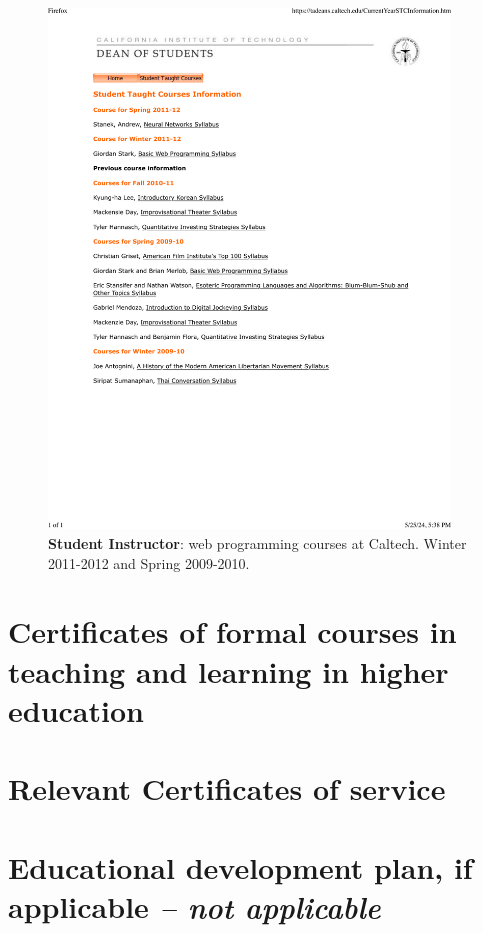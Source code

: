 \begin{figure}[h!]
	\centering
	\caption{\textbf{Student Instructor}: web programming courses at Caltech. Winter 2011-2012 and Spring 2009-2010.}
	\includegraphics[width=0.95\textwidth]{attachments/E-teaching/studentTaughtCourses.htm}
\end{figure}

\section{Certificates of formal courses in teaching and learning in higher education \noneyet} \label{sec:certificates-of-formal-courses-in-teaching-and-learning-in-higher-education-noneyet}
\section{Relevant Certificates of service \noneyet} \label{sec:relevant-certificates-of-service-noneyet}
\section{Educational development plan, if applicable \normalsize{\textit{-- not applicable}}} \label{sec:educational-development-plan-if-applicable-not-applicable}
